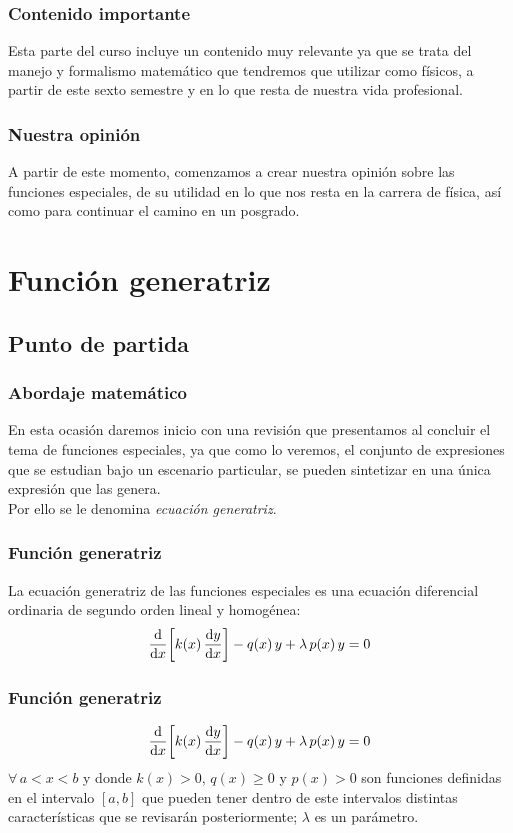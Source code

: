 \documentclass[12pt]{beamer}
\begin{document}
\begin{frame}
\frametitle{Contenido importante}
Esta parte del curso incluye un contenido muy relevante ya que se trata del manejo y formalismo matemático que tendremos que utilizar como físicos, a partir de este sexto semestre y en lo que resta de nuestra vida profesional.
\end{frame}
\begin{frame}
\frametitle{Nuestra opinión}
A partir de este momento, comenzamos a crear nuestra opinión sobre las funciones especiales, de su utilidad en lo que nos resta en la carrera de física, así como para continuar el camino en un posgrado.
\end{frame}

\section{Función generatriz}
\subsection{Punto de partida}

\begin{frame}
\frametitle{Abordaje matemático}
En esta ocasión daremos inicio con una revisión que presentamos al concluir el tema de funciones especiales, ya que como lo veremos, el conjunto de expresiones que se estudian bajo un escenario particular, se pueden sintetizar en una única expresión que las genera.
\\
\bigskip
\pause
Por ello se le denomina \emph{ecuación generatriz}.
\end{frame}
\begin{frame}
\frametitle{Función generatriz}
La ecuación generatriz de las funciones especiales es una ecuación diferencial ordinaria de segundo orden lineal y homogénea:
\begin{align}
\dv{x} \bigg[ k(x) \, \dv{y}{x} \bigg] -  q(x) \, y + \lambda \, p(x) \, y = 0
\label{eq:ecuacion_01_01}
\end{align}
\end{frame}
\begin{frame}
\frametitle{Función generatriz}
\begin{align*}
\dv{x} \bigg[ k(x) \, \dv{y}{x} \bigg] -  q(x) \, y + \lambda \, p(x) \, y = 0
\end{align*}
$\forall \, a < x < b$ y donde $k(x) > 0$, $q(x) \geq 0$ y $p(x) > 0$ son funciones definidas en el intervalo $[a, b]$ que pueden tener dentro de este intervalos distintas características que se revisarán posteriormente; $\lambda$ es un parámetro.
\end{frame}
\end{document}

